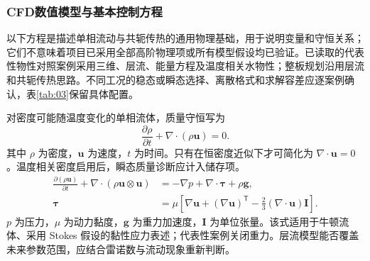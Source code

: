 \documentclass[stage2,UTF8,fontset=fandol]{ydzjreport}
\begin{document}
\subsubsection{CFD数值模型与基本控制方程}
以下方程是描述单相流动与共轭传热的通用物理基础，用于说明变量和守恒关系；它们不意味着项目已采用全部高阶物理项或所有模型假设均已验证。已读取的代表性物性对照案例采用三维、层流、能量方程及温度相关水物性；整板规划沿用层流和共轭传热思路。不同工况的稳态或瞬态选择、离散格式和求解容差应逐案例确认，表\ref{tab:03}保留具体配置。

对密度可能随温度变化的单相流体，质量守恒写为
\begin{equation}\frac{\partial\rho}{\partial t}+\nabla\cdot(\rho\bm u)=0.\label{eq:mass}\end{equation}
其中 $\rho$ 为密度，$\bm u$ 为速度，$t$ 为时间。只有在恒密度近似下才可简化为 $\nabla\cdot\bm u=0$。温度相关密度启用后，瞬态质量诊断应计入储存项。
\begin{equation}\begin{aligned}
\frac{\partial(\rho\bm u)}{\partial t}+\nabla\cdot(\rho\bm u\otimes\bm u)
&=-\nabla p+\nabla\cdot\bm\tau+\rho\bm g,\\
\bm\tau&=\mu\left[\nabla\bm u+(\nabla\bm u)^{\mathsf T}-\frac23(\nabla\cdot\bm u)\bm I\right].
\end{aligned}\label{eq:momentum}
\end{equation}
$p$ 为压力，$\mu$ 为动力黏度，$\bm g$ 为重力加速度，$\bm I$ 为单位张量。该式适用于牛顿流体、采用 Stokes 假设的黏性应力表述；代表性案例关闭重力。层流模型能否覆盖未来参数范围，应结合雷诺数与流动现象重新判断。
\end{document}
